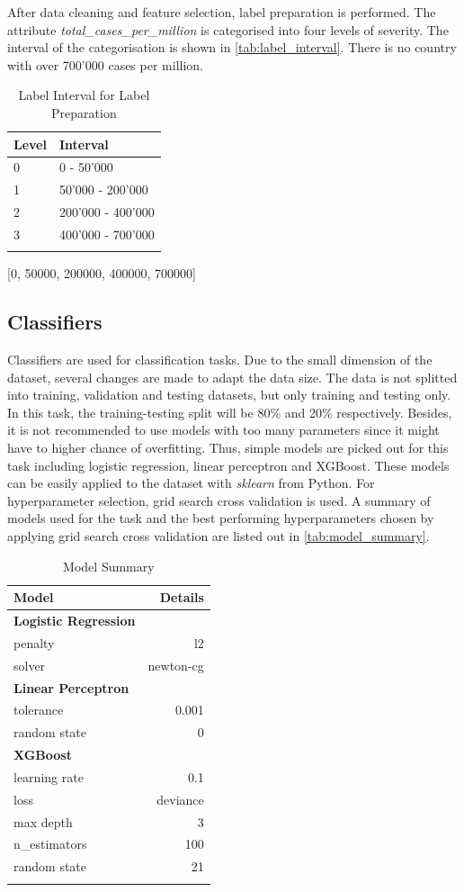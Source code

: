 \documentclass[10pt, a4paper, twocolumn]{article} %
\begin{document}
After data cleaning and feature selection, label preparation is performed. The attribute \emph{total\_cases\_per\_million} 
is categorised into four levels of severity. The interval of the categorisation is shown in \autoref{tab:label_interval}. 
There is no country with over 700'000 cases per million. 
\begin{table}
	\caption{Label Interval for Label Preparation}
	\centering
	\begin{tabular}{ll}
		\toprule
		\textbf{Level} & \textbf{Interval} \\
		\midrule
		0 & 0 - 50'000 \\
		1 & 50'000 - 200'000 \\
		2 & 200'000 - 400'000 \\
		3 & 400'000 - 700'000\\
		\bottomrule
	\label{tab:label_interval}
	\end{tabular}
\end{table}
[0, 50000, 200000, 400000, 700000]
\subsection{Classifiers}
Classifiers are used for classification tasks. Due to the small dimension of the dataset, several changes are made to 
adapt the data size. The data is not splitted into training, validation and testing datasets, but only training and 
testing only. In this task, the training-testing split will be 80\% and 20\% respectively. Besides, it is not recommended 
to use models with too many parameters since it might have to higher chance of overfitting. Thus, simple models are 
picked out for this task including logistic regression, linear perceptron and XGBoost. These models can be easily 
applied to the dataset with \emph{sklearn} from Python. For hyperparameter selection, grid search cross validation 
is used. A summary of models used for the task and the best performing hyperparameters chosen by applying grid search 
cross validation are listed out in \autoref{tab:model_summary}.
\begin{table}
	\caption{Model Summary}
	\centering
	\begin{tabular}{lr}
		\toprule
		\textbf{Model} & \textbf{Details} \\
		\toprule
		\textbf{Logistic Regression} & \\ 
		penalty & l2 \\
		solver & newton-cg \\
		\midrule
		\textbf{Linear Perceptron} & \\
		tolerance & 0.001 \\
		random state & 0 \\
		\midrule
		\textbf{XGBoost} & \\
		learning rate & 0.1\\
		loss & deviance \\
		max depth & 3 \\
		n\_estimators & 100 \\
		random state & 21 \\
	\bottomrule
	\label{tab:model_summary}
	\end{tabular}
\end{table}
\end{document}
